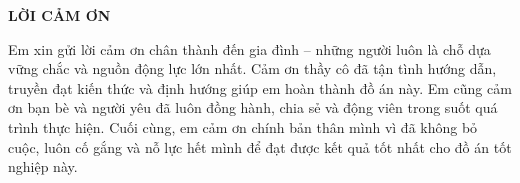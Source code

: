 \documentclass[../DoAn.tex]{subfiles}
\begin{document}
\begin{center}
    \Large{\textbf{LỜI CẢM ƠN}}\\
\end{center}
\vspace{1cm}
Em xin gửi lời cảm ơn chân thành đến gia đình – những người luôn là chỗ dựa vững chắc và nguồn động lực lớn nhất. Cảm ơn thầy cô đã tận tình hướng dẫn, truyền đạt kiến thức và định hướng giúp em hoàn thành đồ án này. Em cũng cảm ơn bạn bè và người yêu đã luôn đồng hành, chia sẻ và động viên trong suốt quá trình thực hiện. Cuối cùng, em cảm ơn chính bản thân mình vì đã không bỏ cuộc, luôn cố gắng và nỗ lực hết mình để đạt được kết quả tốt nhất cho đồ án tốt nghiệp này.
\end{document}
